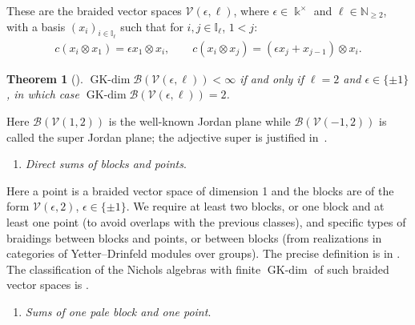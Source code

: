 \documentclass[pdftex]{sigma}
\numberwithin{equation}{section}
\newtheorem{Theorem}{Theorem}[section]
\newcommand{\GK}{\operatorname{GK-dim}}
\newcommand{\toba}{\mathscr B}
\newcommand{\Vc}{{\mathcal{V}}}
\newcommand{\I}{{\mathbb I}}
\newcommand{\N}{{\mathbb N}}
\begin{document}
These are the braided vector spaces $\Vc(\epsilon,\ell)$, where $\epsilon\in \Bbbk^{\times}$ and $\ell \in \N_{\ge 2}$,
with a basis $(x_i)_{i\in\I_\ell}$ such that for $i, j \in \I_\ell$, $1 < j$:
\begin{gather*}%
c(x_i \otimes x_1) = \epsilon x_1 \otimes x_i, \qquad
c(x_i \otimes x_j) =(\epsilon x_j+x_{j-1}) \otimes x_i.
\end{gather*}

\begin{Theorem}[{\cite[Theorem 1.2.2]{AAH-triang}}]\label{th:blocks}
$\GK \toba(\Vc(\epsilon,\ell)) < \infty$ if and only if $\ell = 2$ and $\epsilon \in \{\pm 1\}$, in which case $\GK \toba(\Vc(\epsilon,\ell)) = 2$.
\end{Theorem}

Here $\toba(\Vc(1,2))$ is the well-known Jordan plane while
$\toba(\Vc(-1,2))$ is called the super Jordan plane; the adjective super is justified in~\cite{ap1}.
\begin{enumerate}[label=$(\alph*)$,resume]\itemsep=0pt
\item\label{item:blocks-points}
\emph{Direct sums of blocks and points}.
\end{enumerate}

Here a point is a braided vector space of dimension 1 and the blocks are of the form $\Vc(\epsilon,2)$,
$\epsilon \in \{\pm 1\}$.
We require at least two blocks, or one block and at least one point (to avoid overlaps with the previous classes),
and specific types of braidings between blocks and points, or between blocks (from realizations in categories of Yetter--Drinfeld modules over groups).
The precise definition is in \cite[Section~1.3.1]{AAH-triang}.
The classification of the Nichols algebras with finite $\GK$ of such braided vector spaces is \cite[Theorem~1.3.8]{AAH-triang}.
\begin{enumerate}[label=$(\alph*)$,resume]\itemsep=0pt
\item \label{item:paleblock-point} \emph{Sums of one pale block and one point}.
\end{enumerate}
\end{document}
